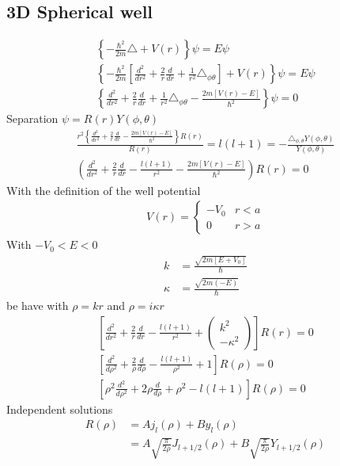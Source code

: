 \documentclass[10pt,a4paper]{book}
\theoremstyle{definition}
\begin{document}
\subsection{3D Spherical well}
\begin{align}
\left\{-\frac{\hbar^2}{2m}\triangle+V(r)\right\}\psi=E\psi\\
\left\{-\frac{\hbar^2}{2m}\left[\frac{d^2}{dr^2}+\frac{2}{r}\frac{d}{dr}+\frac{1}{r^2}\triangle_{\phi\theta}\right]+V(r)\right\}\psi=E\psi\\
\left\{\frac{d^2}{dr^2}+\frac{2}{r}\frac{d}{dr}+\frac{1}{r^2}\triangle_{\phi\theta}-\frac{2m[V(r)-E]}{\hbar^2}\right\}\psi=0
\end{align}
Separation $\psi=R(r)Y(\phi,\theta)$
\begin{align}
\frac{r^2\left\{\frac{d^2}{dr^2}+\frac{2}{r}\frac{d}{dr}-\frac{2m[V(r)-E]}{\hbar^2}\right\}R(r)}{R(r)}=l(l+1)=-\frac{\triangle_{\phi,\theta} Y(\phi,\theta)}{Y(\phi,\theta)}\\
\left(\frac{d^2}{dr^2}+\frac{2}{r}\frac{d}{dr}-\frac{l(l+1)}{r^2}-\frac{2m[V(r)-E]}{\hbar^2}\right)R(r)=0
\end{align}
With the definition of the well potential
\begin{align}
V(r)=\left\{\begin{matrix}
-V_0 & r<a\\
0 & r>a
\end{matrix}\right.
\end{align}
With $-V_0<E<0$
\begin{align}
k&=\frac{\sqrt{2m[E+V_0]}}{\hbar}\\
\kappa&=\frac{\sqrt{2m(-E)}}{\hbar}
\end{align}
be have with $\rho=kr$ and $\rho=i\kappa r$
\begin{align}
\left[\frac{d^2}{dr^2}+\frac{2}{r}\frac{d}{dr}-\frac{l(l+1)}{r^2}+
\left(\begin{matrix}
k^2\\
-\kappa^2
\end{matrix}\right)
\right]R(r)=0\\
\left[\frac{d^2}{d\rho^2}+\frac{2}{\rho}\frac{d}{d\rho}-\frac{l(l+1)}{\rho^2}+1\right]R(\rho)=0\\
\left[\rho^2\frac{d^2}{d\rho^2}+2\rho\frac{d}{d\rho}+\rho^2-l(l+1)\right]R(\rho)=0
\end{align}
Independent solutions
\begin{align}
R(\rho)
&=Aj_l(\rho)+By_l(\rho)\\
&=A\sqrt{\frac{\pi}{2\rho}}J_{l+1/2}(\rho)+B\sqrt{\frac{\pi}{2\rho}}Y_{l+1/2}(\rho)
\end{align}
\end{document}
